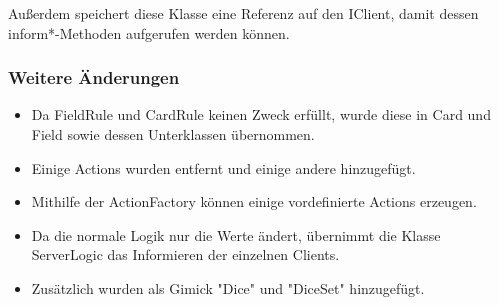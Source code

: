 \documentclass[a4paper,10pt]{article}
\begin{document}
Außerdem speichert diese Klasse eine Referenz auf den IClient, damit dessen inform*-Methoden aufgerufen werden können.

\subsubsection{Weitere Änderungen}
\begin{itemize}
\item Da FieldRule und CardRule keinen Zweck erfüllt, wurde diese in Card und Field sowie dessen Unterklassen übernommen.
\item Einige Actions wurden entfernt und einige andere hinzugefügt.
\item Mithilfe der ActionFactory können einige vordefinierte Actions erzeugen.
\item Da die normale Logik nur die Werte ändert, übernimmt die Klasse ServerLogic das Informieren der einzelnen Clients.
\item Zusätzlich wurden als Gimick "Dice" und "DiceSet" hinzugefügt.
\end{itemize}
\end{document}
